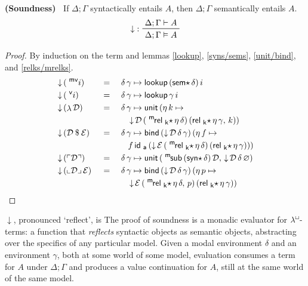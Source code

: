 \documentclass{entcs}
\numberwithin{equation}{thm}
\newcommand{\lambdabox}{\lambda^{\mkern-1mu\sq\mkern-2mu}}
\newcommand{\tsf}[1]{\textsf{\upshape{#1}}}
\newcommand{\stsf}[1]{\tsf{\small{#1}}}
\renewcommand{\:}{\mathrel{:}}
\newcommand{\tyrule}[1]{\prftree[l]{${#1} \:\,$}}
\newcommand{\0}{\varnothing}
\newcommand{\sq}{\Box}
\newcommand{\D}{\mathcal{D}}
\newcommand{\E}{\mathcal{E}}
\renewcommand{\e}{\mathrel{\vdash}}
\newcommand{\mvar}{\operatorname{^{\stsf{mv}\mkern-4mu}}}
\newcommand{\var}{\operatorname{^{\stsf{v}\mkern-4mu}}}
\newcommand{\lam}{\operatorname{\lambda}}
\newcommand{\app}{\mathbin{\$}}
\newcommand{\quo}[1]{\mathopen{\ulcorner}{#1}\mathclose{\urcorner}}
\newcommand{\unq}[1]{\mathopen{\llcorner}{#1}\mathclose{\lrcorner}\,}
\newcommand{\msub}{\operatorname{^{\stsf{m}\mkern-2mu}\tsf{sub}}}
\newcommand{\ida}{\operatorname{\tsf{id}_{\stsf{a}}}}
\newcommand{\syns}{\operatorname{\tsf{syn}\star}}
\newcommand{\sems}{\operatorname{\tsf{sem}\star}}
\newcommand{\eeq}{\mathrel{\vDash}}
\newcommand{\relks}{\operatorname{\tsf{rel}_{\stsf{k}}\star}}
\newcommand{\mrelks}{\operatorname{^{\stsf{m}\mkern-2mu}\tsf{rel}_{\stsf{k}}\star}}
\newcommand{\unit}{\operatorname{\tsf{unit}}}
\newcommand{\bind}{\operatorname{\tsf{bind}}}
\newcommand{\lookup}{\operatorname{\tsf{lookup}}}
\newcommand{\reflect}{\operatorname{\downarrow}}
\begin{document}
\begin{theorem}
  \normalshape
  \textbf{(Soundness)\ }
  \label{reflect}
  If $\Delta; \Gamma$ syntactically entails $A$, then $\Delta; \Gamma$ semantically entails $A$.
  \begin{gather*}
    \tyrule{\reflect}{\Delta; \Gamma \e A}{\Delta; \Gamma \eeq A}
  \end{gather*}
  \itshape
  \begin{proof}
    \normalshape
    By induction on the term and lemmas \ref{lookup}, \ref{syns/sems}, \ref{unit/bind}, and \ref{relks/mrelks}.
    \begin{alignat}{3}
      \label{reflect.mvar} & \reflect\, (\mvar i)    \,&&=\, &&\,\delta\, \gamma \mapsto \lookup\, (\sems \delta)\, i\\
      \label{reflect.var}  & \reflect\, (\var i)     \,&&=\, &&\,\delta\, \gamma \mapsto \lookup \gamma\, i\\
      \label{reflect.lam}  & \reflect\, (\lam \D)    \,&&=\, &&\,\delta\, \gamma \mapsto \unit\, (\eta\,k \mapsto\\
      \nonumber            & && && \quad \reflect \D\, (\mrelks \eta\, \delta)\, (\relks \eta\, \gamma,\, k))\\
      \label{reflect.app}  & \reflect\, (\D \app \E) \,&&=\, &&\,\delta\, \gamma \mapsto \bind\, (\reflect \D\, \delta\, \gamma)\, (\eta\,f \mapsto\\
      \nonumber            & && && \quad f \ida\, (\reflect \E\, (\mrelks \eta\, \delta)\, (\relks \eta\, \gamma)))\\
      \label{reflect.quo}  & \reflect\, (\quo{\D})   \,&&=\, &&\,\delta\, \gamma \mapsto \unit\, (\msub\, (\syns \delta)\, \D,\, \reflect \D\, \delta\, \0)\\
      \label{reflect.unq}  & \reflect\, (\unq{\D}\E) \,&&=\, &&\,\delta\, \gamma \mapsto \bind\, (\reflect \D\, \delta\, \gamma)\, (\eta\,p \mapsto\\
      \nonumber            & && && \quad \reflect \E\, (\mrelks \eta\, \delta,\, p)\, (\relks \eta\, \gamma))
    \end{alignat}
  \end{proof}
\end{theorem}
\noindent
$\reflect$, pronounced `reflect', is The proof of soundness is a monadic evaluator for $\lambdabox$-terms: a function that \emph{reflects} syntactic objects as semantic objects, abstracting over the specifics of any particular model.  Given a modal environment $\delta$ and an environment $\gamma$, both at some world of some model, evaluation consumes a term for $A$ under $\Delta; \Gamma$ and produces a value continuation for $A$, still at the same world of the same model.
\end{document}
